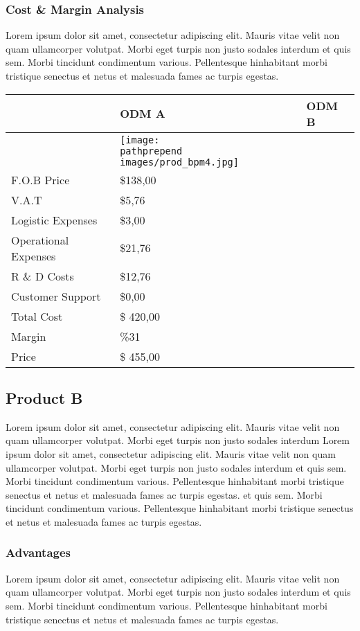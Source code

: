 \documentclass[11pt]{article}
\def\pathprepend{}%
\def\pathprepend{business_plan/}%
\begin{document}
\subsubsection{Cost \& Margin Analysis}
Lorem ipsum dolor sit amet, consectetur adipiscing elit. Mauris vitae velit
non quam ullamcorper volutpat. Morbi eget turpis non justo sodales interdum
et quis sem. Morbi tincidunt condimentum various. Pellentesque hinhabitant morbi
tristique senectus et netus et malesuada fames ac turpis egestas.\newline
\begin{tabular}{ | l | l | l | }\hline
  & ODM A & ODM B \\ \hline
  & \texttt{[image: \\pathprepend images/prod\_bpm4.jpg]}
	&  \\ \hline
  F.O.B Price & \$138,00 &  \\ \hline
  V.A.T & \$5,76 &  \\ \hline
  Logistic Expenses & \$3,00 & \\ \hline
  Operational Expenses & \$21,76 & \\ \hline
  R \& D Costs & \$12,76 &  \\ \hline
  Customer Support & \$0,00 &  \\ \hline
  Total Cost & \$ 420,00 &  \\ \hline
  Margin & \%31 &  \\ \hline
  Price & \$ 455,00 &  \\ \hline
\end{tabular}
\pagebreak


\subsection{Product B}
Lorem ipsum dolor sit amet, consectetur adipiscing elit. Mauris vitae velit
non quam ullamcorper volutpat. Morbi eget turpis non justo sodales interdum
Lorem ipsum dolor sit amet, consectetur adipiscing elit. Mauris vitae velit
non quam ullamcorper volutpat. Morbi eget turpis non justo sodales interdum
et quis sem. Morbi tincidunt condimentum various. Pellentesque hinhabitant morbi
tristique senectus et netus et malesuada fames ac turpis egestas.
et quis sem. Morbi tincidunt condimentum various. Pellentesque hinhabitant morbi
tristique senectus et netus et malesuada fames ac turpis egestas.\newline
\subsubsection{Advantages}
Lorem ipsum dolor sit amet, consectetur adipiscing elit. Mauris vitae velit
non quam ullamcorper volutpat. Morbi eget turpis non justo sodales interdum
et quis sem. Morbi tincidunt condimentum various. Pellentesque hinhabitant morbi
tristique senectus et netus et malesuada fames ac turpis egestas.\newline
\end{document}
